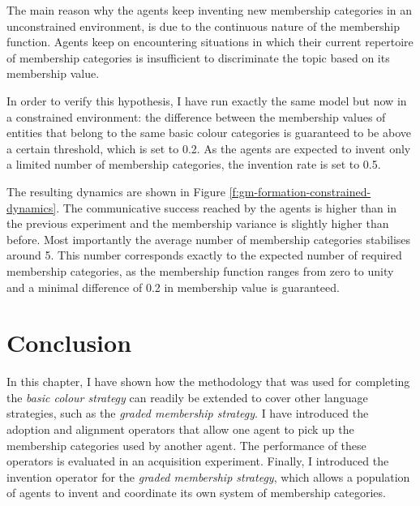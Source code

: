 The main reason why the agents keep inventing new membership
categories in an unconstrained environment, is due to the continuous
nature of the membership function. Agents keep on encountering
situations in which their current repertoire of membership categories
is insufficient to discriminate the topic based on its membership
value. 

In order to verify this hypothesis, I have run exactly the same
model but now in a constrained environment: the difference between the
membership values of entities that belong to the same basic colour
categories is guaranteed to be above a certain threshold, which is set
to 0.2. As the agents are expected to invent only a limited number of
membership categories, the invention rate is set to 0.5.

The resulting dynamics are shown in Figure
\ref{f:gm-formation-constrained-dynamics}. The communicative success
reached by the agents is higher than in the previous experiment and
the membership variance is slightly higher than before. Most
importantly the average number of membership categories stabilises
around 5. This number corresponds exactly to the expected number of
required membership categories, as the membership function ranges from
zero to unity and a minimal difference of 0.2 in membership value is
guaranteed.



\section{Conclusion}

In this chapter, I have shown how the methodology that was used for
completing the \emph{basic colour strategy} can readily be extended to cover
other language strategies, such as the \emph{graded membership strategy}. I
have introduced the adoption and alignment operators that allow one
agent to pick up the membership categories used by another agent. The
performance of these operators is evaluated in an acquisition
experiment. Finally, I introduced the invention operator for the \emph{graded
membership strategy}, which allows a population of agents to invent and
coordinate its own system of membership categories.